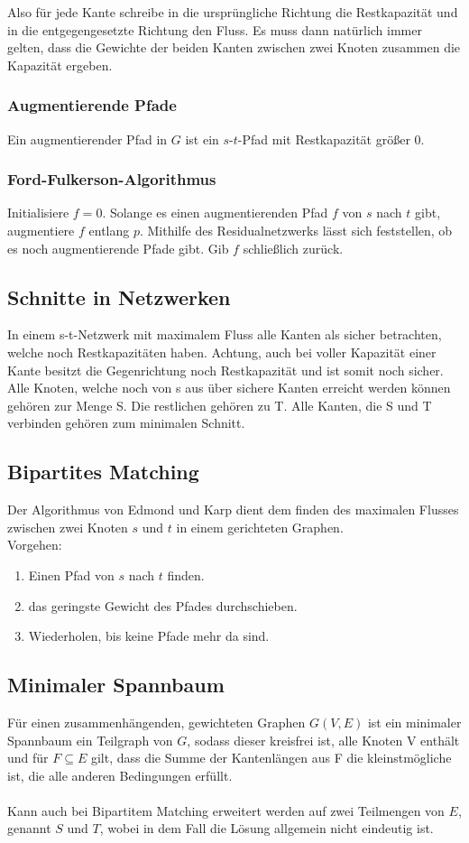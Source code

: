 \documentclass[11pt]{scrartcl}
\begin{document}
Also für jede Kante schreibe in die ursprüngliche Richtung die Restkapazität und in die entgegengesetzte Richtung den Fluss. Es muss dann natürlich immer gelten, dass die Gewichte der beiden Kanten zwischen zwei Knoten zusammen die Kapazität ergeben.

\subsubsection{Augmentierende Pfade}
Ein augmentierender Pfad in $G$ ist ein $s$-$t$-Pfad mit Restkapazität größer 0.

\subsubsection{Ford-Fulkerson-Algorithmus}
Initialisiere $f=0$. Solange es einen augmentierenden Pfad $f$ von $s$ nach $t$ gibt, augmentiere $f$ entlang $p$. Mithilfe des Residualnetzwerks lässt sich feststellen, ob es noch augmentierende Pfade gibt. Gib $f$ schließlich zurück.

\subsection{Schnitte in Netzwerken}

In einem s-t-Netzwerk mit maximalem Fluss alle Kanten als sicher betrachten, welche noch Restkapazitäten haben. Achtung, auch bei voller Kapazität einer Kante besitzt die Gegenrichtung noch Restkapazität und ist somit noch sicher. Alle Knoten, welche noch von s aus über sichere Kanten erreicht werden können gehören zur Menge S. Die restlichen gehören zu T. Alle Kanten, die S und T verbinden gehören zum minimalen Schnitt.

\subsection{Bipartites Matching}
Der Algorithmus von Edmond und Karp dient dem finden des maximalen Flusses zwischen zwei Knoten $s$ und $t$ in einem gerichteten Graphen. \\
Vorgehen:
\begin{enumerate}
\item Einen Pfad von $s$ nach $t$ finden.
\item das geringste Gewicht des Pfades durchschieben.
\item Wiederholen, bis keine Pfade mehr da sind.
\end{enumerate}

\subsection{Minimaler Spannbaum}
Für einen zusammenhängenden, gewichteten Graphen $G(V,E)$ ist ein minimaler Spannbaum ein Teilgraph von $G$, sodass dieser kreisfrei ist, alle Knoten V enthält und für $F \subseteq E$ gilt, dass die Summe der Kantenlängen aus F die kleinstmögliche ist, die alle anderen Bedingungen erfüllt. \\
\\
Kann auch bei Bipartitem Matching erweitert werden auf zwei Teilmengen von $E$, genannt $S$ und $T$, wobei in dem Fall die Lösung allgemein nicht eindeutig ist.
\end{document}
